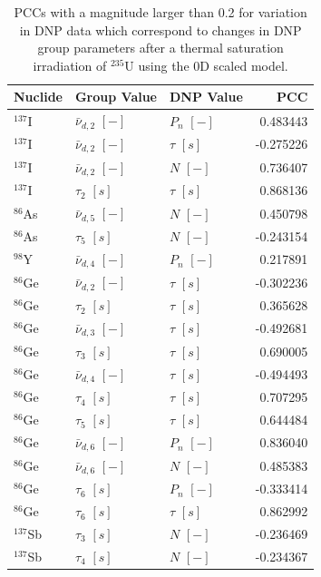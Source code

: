 \begin{table}[!ht]
    \centering
    \caption{\Glspl{PCC} with a magnitude larger than 0.2 for variation in \gls{DNP} data which correspond to changes in \gls{DNP} group parameters after a thermal saturation irradiation of $^{235}$U using the 0D scaled model.}
\begin{tabular}{lllr}
\hline
Nuclide & Group Value & \gls{DNP} Value & \gls{PCC} \\
\hline
       $^{137}$I & $\bar{\nu}_{d, 2}$ $[-]$ & $P_{n}$ $[-]$ & 0.483443 \\
       $^{137}$I & $\bar{\nu}_{d, 2}$ $[-]$ & $\tau$ $[s]$ & -0.275226 \\
       $^{137}$I & $\bar{\nu}_{d, 2}$ $[-]$ & $N$ $[-]$ & 0.736407 \\
       $^{137}$I & $\tau_2$ $[s]$ & $\tau$ $[s]$ & 0.868136 \\
       $^{86}$As & $\bar{\nu}_{d, 5}$ $[-]$ & $N$ $[-]$ & 0.450798 \\
       $^{86}$As & $\tau_5$ $[s]$ & $N$ $[-]$ & -0.243154 \\
       $^{98}$Y & $\bar{\nu}_{d, 4}$ $[-]$ & $P_{n}$ $[-]$ & 0.217891 \\
       $^{86}$Ge & $\bar{\nu}_{d, 2}$ $[-]$ & $\tau$ $[s]$ & -0.302236 \\
       $^{86}$Ge & $\tau_2$ $[s]$ & $\tau$ $[s]$ & 0.365628 \\
       $^{86}$Ge & $\bar{\nu}_{d, 3}$ $[-]$ & $\tau$ $[s]$ & -0.492681 \\
       $^{86}$Ge & $\tau_3$ $[s]$ & $\tau$ $[s]$ & 0.690005 \\
       $^{86}$Ge & $\bar{\nu}_{d, 4}$ $[-]$ & $\tau$ $[s]$ & -0.494493 \\
       $^{86}$Ge & $\tau_4$ $[s]$ & $\tau$ $[s]$ & 0.707295 \\
       $^{86}$Ge & $\tau_5$ $[s]$ & $\tau$ $[s]$ & 0.644484 \\
       $^{86}$Ge & $\bar{\nu}_{d, 6}$ $[-]$ & $P_{n}$ $[-]$ & 0.836040 \\
       $^{86}$Ge & $\bar{\nu}_{d, 6}$ $[-]$ & $N$ $[-]$ & 0.485383 \\
       $^{86}$Ge & $\tau_6$ $[s]$ & $P_{n}$ $[-]$ & -0.333414 \\
       $^{86}$Ge & $\tau_6$ $[s]$ & $\tau$ $[s]$ & 0.862992 \\
       $^{137}$Sb & $\tau_3$ $[s]$ & $N$ $[-]$ & -0.236469 \\
       $^{137}$Sb & $\tau_4$ $[s]$ & $N$ $[-]$ & -0.234367 \\

\end{tabular}
\end{table}
